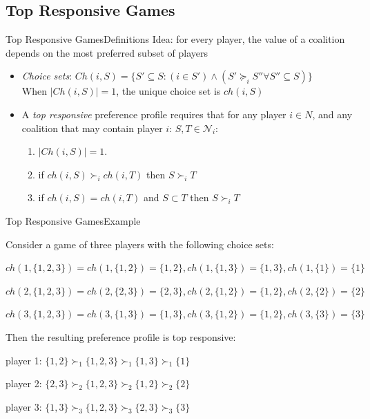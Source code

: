 \documentclass[xcolor=dvipsnames]{beamer}
\newcommand{\Ch}{\mathit{Ch}}
\newcommand{\ch}{\mathit{ch}}
\begin{document}
\subsection{Top Responsive Games}
\begin{frame}{Top Responsive Games}{Definitions}
  Idea: for every player, the value of a coalition depends on the most preferred subset of players
  \begin{itemize}
    \item \textit{Choice sets}:
      $\Ch(i, S) = \{S' \subseteq S: (i \in S') \wedge (S' \succeq_i S'' \forall S'' \subseteq S)\}$\\
      When $|\Ch(i, S)| = 1$, the unique choice set is $\ch(i, S)$
    \item A \textit{top responsive} preference profile requires that for any player $i \in N$,
    and any coalition that may contain player $i$: $S, T \in \mathcal{N}_i$:
    \begin{enumerate}
      \item $|\Ch(i, S)| = 1$.
      \item if $\ch(i, S) \succ_i \ch(i, T)$ then $S \succ_i T$
      \item if $\ch(i, S) = \ch(i, T)$ and $S \subset T$ then $S \succ_i T$
    \end{enumerate}
  \end{itemize}
\end{frame}

\begin{frame}{Top Responsive Games}{Example}
\begin{example}
\label{example:top_responsive_pref}
  Consider a game of three players with the following choice sets:

  $\ch(1, \{1, 2, 3\}) = \ch(1, \{1, 2\}) = \{1, 2\},
   \ch(1, \{1, 3\}) = \{1, 3\}, \ch(1, \{1\}) = \{1\}$

  $\ch(2, \{1, 2, 3\}) = \ch(2, \{2, 3\}) = \{2, 3\},
   \ch(2, \{1, 2\}) = \{1, 2\}, \ch(2, \{2\}) = \{2\}$

  $\ch(3, \{1, 2, 3\}) = \ch(3, \{1, 3\}) = \{1, 3\},
   \ch(3, \{1, 2\}) = \{1, 2\}, \ch(3, \{3\}) = \{3\}$

  Then the resulting preference profile is top responsive:

  player 1: $\{1, 2\} \succ_1 \{1, 2, 3\} \succ_1 \{1, 3\} \succ_1  \{1\}$

  player 2: $\{2, 3\} \succ_2 \{1, 2, 3\} \succ_2 \{1, 2\} \succ_2  \{2\}$

  player 3: $\{1, 3\} \succ_3 \{1, 2, 3\} \succ_3 \{2, 3\} \succ_3  \{3\}$
\end{example}
\end{frame}
\end{document}
